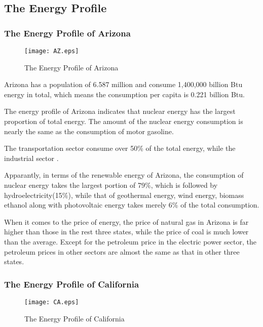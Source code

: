 \newpage
\subsection{The Energy Profile }
\subsubsection{The Energy Profile of Arizona}


\begin{figure}[h]

\centering
\texttt{[image: AZ.eps]}
\caption{The Energy Profile of Arizona} \label{fig:aa}
\end{figure}
\small
Arizona has a population of 6.587 million and  consume 1,400,000 billion Btu energy in total, which means the consumption per capita is 0.221 billion Btu.


The energy profile of Arizona indicates that nuclear energy has the largest proportion of total energy. The amount of the nuclear energy consumption is nearly the same as the consumption of motor gasoline. 


The transportation sector consume over 50\% of the total energy, while the industrial sector .


Apparantly, in terms of  the renewable energy of Arizona, the consumption of nuclear energy takes the largest portion of 79\%, which  is followed by hydroelectricity(15\%), while that of geothermal energy, wind energy, biomass ethanol along with photovoltaic energy  takes merely 6\% of the total consumption.


When it comes to the price of energy, the price of natural gas in Arizona is far higher than those in the rest three states,  while the price of coal is much lower than the average. Except for the petroleum price in the electric power sector, the petroleum prices in other sectors are almost the same as that in other three states.








\newpage
\subsubsection{The Energy Profile of California}

\begin{figure}[h]

\centering
\texttt{[image: CA.eps]}
\caption{The Energy Profile of California} \label{fig:aa}
\end{figure}


